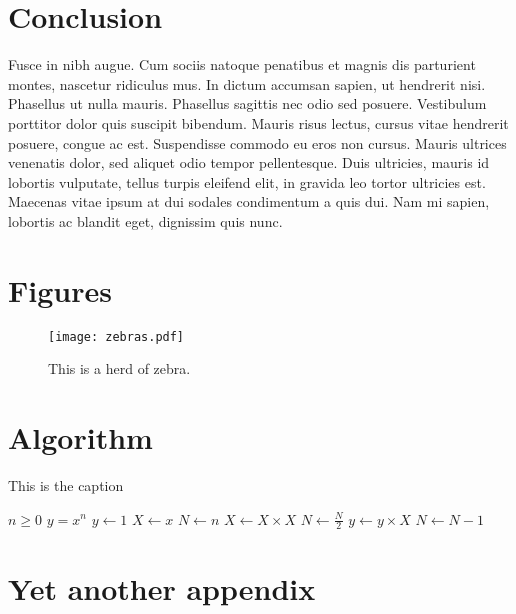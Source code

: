 \documentclass[11pt]{isr} %
\begin{document}
\section*{Conclusion}
Fusce in nibh augue. Cum sociis natoque penatibus et magnis dis parturient montes, nascetur ridiculus mus. In dictum accumsan sapien, ut hendrerit nisi. Phasellus ut nulla mauris. Phasellus sagittis nec odio sed posuere. Vestibulum porttitor dolor quis suscipit bibendum. Mauris risus lectus, cursus vitae hendrerit posuere, congue ac est. Suspendisse commodo eu eros non cursus. Mauris ultrices venenatis dolor, sed aliquet odio tempor pellentesque. Duis ultricies, mauris id lobortis vulputate, tellus turpis eleifend elit, in gravida leo tortor ultricies est. Maecenas vitae ipsum at dui sodales condimentum a quis dui. Nam mi sapien, lobortis ac blandit eget, dignissim quis nunc.

\newpage






\newpage

\appendix
\section{Figures}

\begin{figure}[h]
\begin{center}
\texttt{[image: zebras.pdf]}
\caption{This is a herd of zebra.}
\end{center}
\end{figure}

\section{Algorithm}
\begin{algorithm}
\caption{This is the caption}\label{alg:cap}
\begin{algorithmic}
\Require $n \geq 0$
\Ensure $y = x^n$
\State $y \gets 1$
\State $X \gets x$
\State $N \gets n$
    \State $X \gets X \times X$
    \State $N \gets \frac{N}{2}$  
    \State $y \gets y \times X$
    \State $N \gets N - 1$
\EndIf
\EndWhile
\end{algorithmic}
\end{algorithm}

\section{Yet another appendix}
\end{document}
